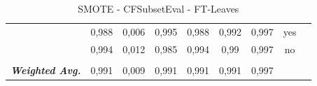 \begin{table}[htbp]
{\begin{tabular}{rrrrrrrrr}
				\multicolumn{1}{c}{} & \multicolumn{1}{c}{0,988} & \multicolumn{1}{c}{0,006} & \multicolumn{1}{c}{0,995} & \multicolumn{1}{c}{0,988} & \multicolumn{1}{c}{0,992} & \multicolumn{1}{c}{0,997} & \multicolumn{1}{c}{yes} &  \\
				\multicolumn{1}{c}{} & \multicolumn{1}{c}{0,994} & \multicolumn{1}{c}{0,012} & \multicolumn{1}{c}{0,985} & \multicolumn{1}{c}{0,994} & \multicolumn{1}{c}{0,99} & \multicolumn{1}{c}{0,997} & \multicolumn{1}{c}{no} &  \\
				\multicolumn{1}{c}{} & \multicolumn{1}{c}{} & \multicolumn{1}{c}{} & \multicolumn{1}{c}{} & \multicolumn{1}{c}{} & \multicolumn{1}{c}{} & \multicolumn{1}{c}{} & \multicolumn{1}{c}{} &  \\
				\multicolumn{1}{c}{\textit{\textbf{Weighted Avg.}}} & \multicolumn{1}{c}{0,991} & \multicolumn{1}{c}{0,009} & \multicolumn{1}{c}{0,991} & \multicolumn{1}{c}{0,991} & \multicolumn{1}{c}{0,991} & \multicolumn{1}{c}{0,997} & \multicolumn{1}{c}{} &  \\
			\end{tabular}%
	}
	\label{tab:FTLeavesExtendFiltered}%
	\caption{ SMOTE - CFSubsetEval - FT-Leaves}
\end{table}%

